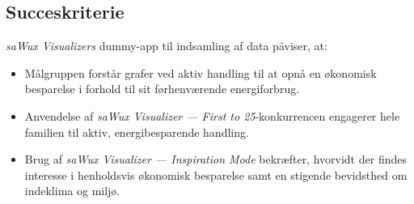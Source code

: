 \subsection{Succeskriterie}
\emph{saWux Visualizers} dummy-app til indsamling af data påviser, at:
\begin{itemize}
    \item Målgruppen forstår grafer ved aktiv handling til at opnå en økonomisk besparelse i forhold til sit førhenværende energiforbrug.
    \item Anvendelse af \emph{saWux Visualizer — First to 25}-konkurrencen engagerer hele familien til aktiv, energibesparende handling.
    \item Brug af \emph{saWux Visualizer — Inspiration Mode} bekræfter, hvorvidt der findes interesse i henholdsvis økonomisk besparelse samt en stigende bevidsthed om indeklima og miljø.
\end{itemize}


